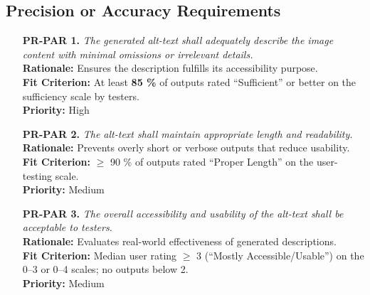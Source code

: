 \documentclass[12pt]{article}
\begin{document}
\subsection{Precision or Accuracy Requirements}
\label{sec:PrecisionAccuracy}
\begin{itemize}
    \item[\textbf{PR-PAR 1.}] \textit{The generated alt-text shall adequately describe the image content with minimal omissions or irrelevant details.}\\
    \textbf{Rationale:} Ensures the description fulfills its accessibility purpose.\\
    \textbf{Fit Criterion:} At least \textbf{85 \%} of outputs rated “Sufficient” or better on the sufficiency scale by testers.\\
    \textbf{Priority:} High

    \item[\textbf{PR-PAR 2.}] \textit{The alt-text shall maintain appropriate length and readability.}\\
    \textbf{Rationale:} Prevents overly short or verbose outputs that reduce usability.\\
    \textbf{Fit Criterion:} $\geq$ 90 \% of outputs rated “Proper Length” on the user-testing scale.\\
    \textbf{Priority:} Medium

    \item[\textbf{PR-PAR 3.}] \textit{The overall accessibility and usability of the alt-text shall be acceptable to testers.}\\
    \textbf{Rationale:} Evaluates real-world effectiveness of generated descriptions.\\
    \textbf{Fit Criterion:} Median user rating $\geq$ 3 (“Mostly Accessible/Usable”) on the 0–3 or 0–4 scales; no outputs below 2.\\
    \textbf{Priority:} Medium
\end{itemize}
\end{document}
